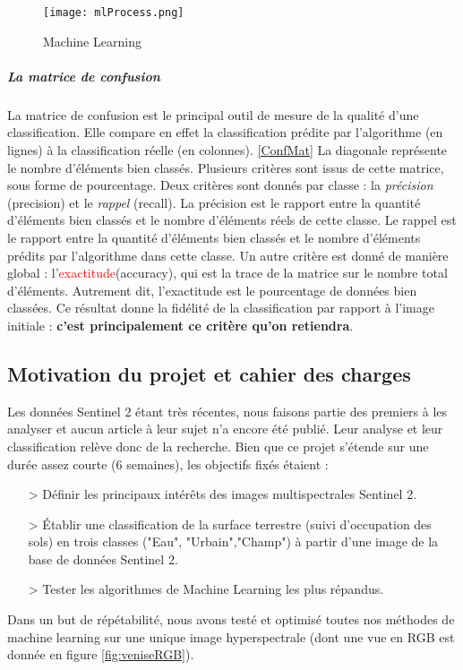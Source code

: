 \begin{figure}[H]
  \centering
    \texttt{[image: mlProcess.png]}
  \caption{Machine Learning}
  \label{fig:ml}
\end{figure}

\subparagraph{La matrice de confusion}
\paragraph{}
La matrice de confusion est le principal outil de mesure de la qualité d'une classification. Elle compare en effet la classification prédite par l'algorithme (en lignes) à la classification réelle (en colonnes). \ref{ConfMat}
La diagonale représente le nombre d'éléments bien classés. \newline
Plusieurs critères sont issus de cette matrice, sous forme de pourcentage. Deux critères sont donnés par classe : la \textit{précision} (precision) et le \textit{rappel} (recall). La précision est le rapport entre la quantité d'éléments bien classés et le nombre d'éléments réels de cette classe. Le rappel est le rapport entre la quantité d'éléments bien classés et le nombre d'éléments prédits par l'algorithme dans cette classe.\newline
Un autre critère est donné de manière global : l'\textcolor{red}{exactitude}(accuracy), qui est la trace de la matrice sur le nombre total d'éléments. Autrement dit, l'exactitude est le pourcentage de données bien classées. Ce résultat donne la fidélité de la classification par rapport à l'image initiale : \textbf{c'est principalement ce critère qu'on retiendra}.




\subsection{Motivation du projet et cahier des charges}

Les données Sentinel 2 étant très récentes, nous faisons partie des premiers à les analyser et aucun article à leur sujet n'a encore été publié. Leur analyse et leur classification relève donc de la recherche. 
Bien que ce projet s'étende sur une durée assez courte (6 semaines), les objectifs fixés étaient :
\begin{itemize}
  \item[>] Définir les principaux intérêts des images multispectrales Sentinel 2.
  \item[>] Établir une classification de la surface terrestre (suivi d'occupation des sols) en trois classes ("Eau", "Urbain","Champ") à partir d'une image de la base de données Sentinel 2.
  \item[>] Tester les algorithmes de Machine Learning les plus répandus.
\end{itemize}

  Dans un but de répétabilité, nous avons testé et optimisé toutes nos méthodes de machine learning sur une unique image hyperspectrale (dont une vue en RGB est donnée en figure \ref{fig:veniseRGB}).
 
